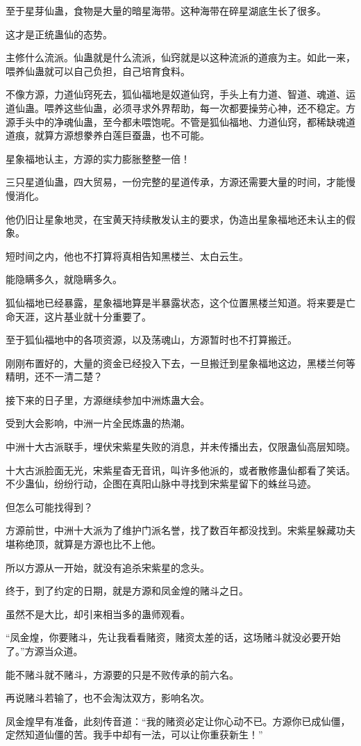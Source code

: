 \begin{this_body}
至于星芽仙蛊，食物是大量的暗星海带。这种海带在碎星湖底生长了很多。

这才是正统蛊仙的态势。

主修什么流派。仙蛊就是什么流派，仙窍就是以这种流派的道痕为主。如此一来，喂养仙蛊就可以自己负担，自己培育食料。

不像方源，力道仙窍死去，狐仙福地是奴道仙窍，手头上有力道、智道、魂道、运道仙蛊。喂养这些仙蛊，必须寻求外界帮助，每一次都要操劳心神，还不稳定。方源手头中的净魂仙蛊，至今都未喂饱呢。不管是狐仙福地、力道仙窍，都稀缺魂道道痕，就算方源想豢养白莲巨蚕蛊，也不可能。

星象福地认主，方源的实力膨胀整整一倍！

三只星道仙蛊，四大贸易，一份完整的星道传承，方源还需要大量的时间，才能慢慢消化。

他仍旧让星象地灵，在宝黄天持续散发认主的要求，伪造出星象福地还未认主的假象。

短时间之内，他也不打算将真相告知黑楼兰、太白云生。

能隐瞒多久，就隐瞒多久。

狐仙福地已经暴露，星象福地算是半暴露状态，这个位置黑楼兰知道。将来要是亡命天涯，这片基业就十分重要了。

至于狐仙福地中的各项资源，以及荡魂山，方源暂时也不打算搬迁。

刚刚布置好的，大量的资金已经投入下去，一旦搬迁到星象福地这边，黑楼兰何等精明，还不一清二楚？

接下来的日子里，方源继续参加中洲炼蛊大会。

受到大会影响，中洲一片全民炼蛊的热潮。

中洲十大古派联手，埋伏宋紫星失败的消息，并未传播出去，仅限蛊仙高层知晓。

十大古派脸面无光，宋紫星杳无音讯，叫许多他派的，或者散修蛊仙都看了笑话。不少蛊仙，纷纷行动，企图在真阳山脉中寻找到宋紫星留下的蛛丝马迹。

但怎么可能找得到？

方源前世，中洲十大派为了维护门派名誉，找了数百年都没找到。宋紫星躲藏功夫堪称绝顶，就算是方源也比不上他。

所以方源从一开始，就没有追杀宋紫星的念头。

终于，到了约定的日期，就是方源和凤金煌的赌斗之日。

虽然不是大比，却引来相当多的蛊师观看。

“凤金煌，你要赌斗，先让我看看赌资，赌资太差的话，这场赌斗就没必要开始了。”方源当众道。

能不赌斗就不赌斗，方源要的只是不败传承的前六名。

再说赌斗若输了，也不会淘汰双方，影响名次。

凤金煌早有准备，此刻传音道：“我的赌资必定让你心动不已。方源你已成仙僵，定然知道仙僵的苦。我手中却有一法，可以让你重获新生！”

\end{this_body}

